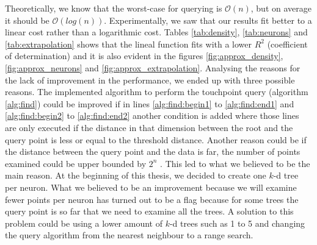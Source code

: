 Theoretically, we know that the worst-case for querying is $\mathcal{O}(n)$, but on average it should be $\mathcal{O}(log(n))$. Experimentally, we saw that our results fit better to a linear cost rather than a logarithmic cost. Tables \ref{tab:density}, \ref{tab:neurons} and \ref{tab:extrapolation} shows that the lineal function fits with a lower $R^2$ (coefficient of determination) and it is also evident in the figures \ref{fig:approx_density}, \ref{fig:approx_neurons} and \ref{fig:approx_extrapolation}. Analysing the reasons for the lack of improvement in the performance, we ended up with three possible reasons. The implemented algorithm to perform the touchpoint query (algorithm \ref{alg:find}) could be improved if in lines \ref{alg:find:begin1} to \ref{alg:find:end1} and \ref{alg:find:begin2} to \ref{alg:find:end2} another condition is added where those lines are only executed if the distance in that dimension between the root and the query point is less or equal to the threshold distance. Another reason could be if the distance between the query point and the data is far, the number of points examined could be upper bounded by $2^n$ \cite{Friedman1977-bv}. This led to what we believed to be the main reason. At the beginning of this thesis, we decided to create one $k$-d tree per neuron. What we believed to be an improvement because we will examine fewer points per neuron has turned out to be a flag because for some trees the query point is so far that we need to examine all the trees. A solution to this problem could be using a lower amount of $k$-d trees such as 1 to 5 and changing the query algorithm from the nearest neighbour to a range search.